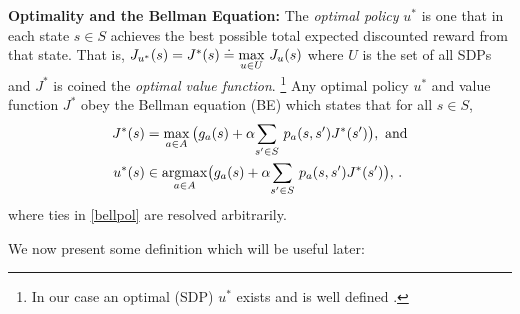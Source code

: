 \textbf{Optimality and the Bellman Equation:} The \emph{optimal policy} $u^*$ is one that in each state $s\in S$ achieves the best possible total expected discounted reward from that state. That is, $J_{u^*}(s) = J^*(s) \doteq \underset{u\in U}{\max}~ J_u(s)$
where $U$ is the set of all SDPs and $J^*$ is coined the \emph{optimal value function}.
\footnote{In our case an optimal (SDP) $u^*$ exists and is well defined \cite{BertB}.}
Any optimal policy $u^*$ and value function $J^*$ obey the Bellman equation (BE) which states that for all $ s \in S$,
\begin{subequations}\label{bell}
\begin{align}
\label{bellval}J^*(s)&=\max_{ a\in A}\big(g_a(s)+\alpha \us{\sum}{s'\in S}p_a(s,s')J^*(s')\big),~\text{and}\\
\label{bellpol}u^*(s)&\in \underset{a\in A}{\argmax}\big(g_a(s)+\alpha \us{\sum}{s'\in S}p_a(s,s')J^*(s')\big),\,.
\end{align}
\end{subequations}
where ties in \eqref{bellpol} are resolved arbitrarily.\par
We now present some definition which will be useful later:
